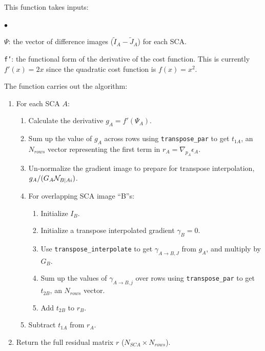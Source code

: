 \documentclass[]{pasj01}
\begin{document}
This function takes inputs: 
\begin{list}{$\bullet$}{}
\item {\tt $\Psi$}: the vector of difference images ($\tilde{I}_A-\tilde{J}_A$) for each SCA.
\item {\tt f'}: the functional form of the derivative of the cost function. This is currently $f'(x)=2x$ since the quadratic cost function is $f(x)=x^2$.
\end{list}
The function carries out the algorithm:
\begin{enumerate}
\item For each SCA $A$:
\begin{enumerate}
    \item Calculate the derivative $g_A=f'(\Psi_A)$.
    \item Sum up the value of $g_A$ across rows using {\tt transpose\_par} to get $t_{1A}$, an $N_{rows}$ vector representing the first term in $r_A = \nabla_{p_A}\epsilon_A$.
    \item Un-normalize the gradient image to prepare for transpose interpolation, $g_A/(G_A{\cal N}_{B|Ai})$.
    \item For overlapping SCA image ``B''s:
    \begin{enumerate}
        \item Initialize $I_B$.
        \item Initialize a transpose interpolated gradient $\gamma_B=0$.
        \item Use {\tt transpose\_interpolate} to get $\gamma_{A\to B, J}$ from $g_A$, and multiply by $G_B$.
        \item Sum up the values of $\gamma_{A\to B, j}$ over rows using {\tt transpose\_par} to get $t_{2B}$, an $N_{rows}$ vector.
        \item Add $t_{2B}$ to $r_B$.
    \end{enumerate}
    \item Subtract $t_{1A}$ from $r_A$.
\end{enumerate}
\item Return the full residual matrix $r$ ($N_{SCA}\times N_{rows}$).
\end{enumerate}
\end{document}
